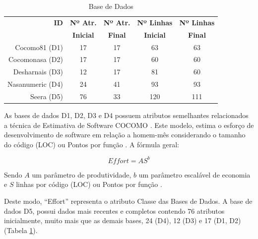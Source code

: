 \documentclass[12pt]{article}
\begin{document}
\begin{table}[h!]
  \begin{center}
    \caption{Base de Dados}
    \label{tab_bases}
    \begin{tabular}{r|c|c|c|c}
      \textbf{ID}      & \textbf{Nº Atr.} & \textbf{Nº Atr.} & \textbf{Nº Linhas} & \textbf{Nº Linhas} \\
      \textbf{}        & \textbf{Inicial} & \textbf{Final}   & \textbf{ Inicial}  & \textbf{Final}     \\
      \hline
      Cocomo81 (D1)    & 17               & 17               & 63                 & 63                 \\
      Cocomonasa (D2)  & 17               & 17               & 60                 & 60                 \\
      Desharnais (D3)  & 12               & 17               & 81                 & 60                 \\
      Nasanumeric (D4) & 24               & 41               & 93                 & 93                 \\
      Seera (D5)       & 76               & 33               & 120                & 111                \\
    \end{tabular}
  \end{center}
\end{table}

As bases de dados D1, D2, D3 e D4 possuem atributos semelhantes relacionados a técnica de Estimativa de Software COCOMO \cite{boehm:1981}. Este modelo, estima o esforço de desenvolvimento de software em relação a homem-mês considerando o tamanho do código (LOC) ou Pontos por função \cite{banimustafa:2018}. A fórmula geral:

\begin{equation}
  Effort = A S^b
\end{equation}

Sendo $A$ um parâmetro de produtividade, $b$ um parâmetro escalável de economia e $S$ linhas por código (LOC) ou Pontos por função \cite{shepperd:1997}.

Deste modo, ``Effort'' representa o atributo Classe das Bases de Dados. A base de dados D5, possui dados mais recentes e completos contendo 76 atributos inicialmente, muito mais que as demais bases, 24 (D4), 12 (D3) e 17 (D1, D2) (Tabela \ref{tab_bases}).
\end{document}

